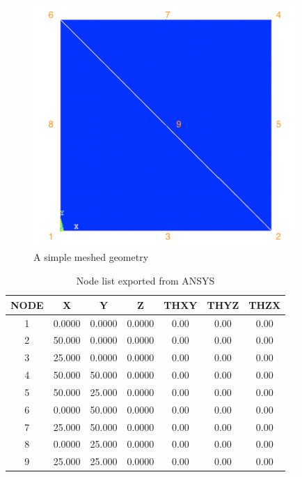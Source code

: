 \begin{figure}
	\begin{center}
		\includegraphics[width=10cm,clip]{muster.png} 			
		\caption{A simple meshed geometry} \label{fig: muster}
	\end{center}
\end{figure}

\begin{table}
	\begin{center}
		\caption{Node list exported from ANSYS}\label{tab: node_list}
		\begin{tabular}{ ccccccc }
			\hline			
			NODE & X & Y & Z & THXY & THYZ & THZX\\ \hline
			1 & 0.0000 & 0.0000 & 0.0000 & 0.00 & 0.00 & 0.00 \\
			2 & 50.000 & 0.0000 & 0.0000 & 0.00 & 0.00 & 0.00 \\
			3 & 25.000 & 0.0000 & 0.0000 & 0.00 & 0.00 & 0.00 \\
			4 & 50.000 & 50.000 & 0.0000 & 0.00 & 0.00 & 0.00 \\
			5 & 50.000 & 25.000 & 0.0000 & 0.00 & 0.00 & 0.00 \\
			6 & 0.0000 & 50.000 & 0.0000 & 0.00 & 0.00 & 0.00 \\
			7 & 25.000 & 50.000 & 0.0000 & 0.00 & 0.00 & 0.00 \\
			8 & 0.0000 & 25.000 & 0.0000 & 0.00 & 0.00 & 0.00 \\
			9 & 25.000 & 25.000 & 0.0000 & 0.00 & 0.00 & 0.00 \\
			\hline  
		\end{tabular}	
	\end{center}
\end{table}

